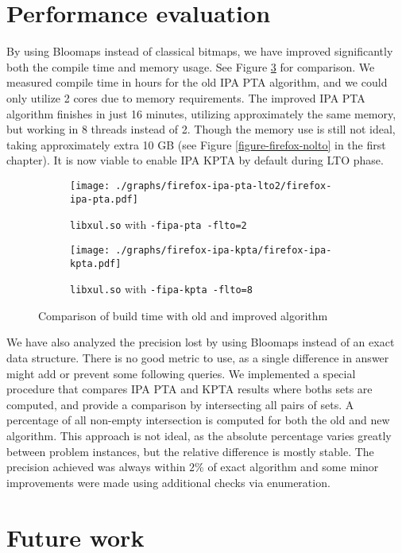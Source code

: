 \section{Performance evaluation}

By using Bloomaps instead of classical bitmaps, we have improved significantly
both the compile time and memory usage. See Figure
\ref{figure-new-old-comparison} for comparison. We measured compile time in
hours for the old IPA PTA algorithm, and we could only utilize 2 cores due to
memory requirements. The improved IPA PTA algorithm finishes in just 16 minutes,
utilizing approximately the same memory, but working in 8 threads instead of 2.
Though the memory use is still not ideal, taking approximately extra 10 GB (see
Figure \ref{figure-firefox-nolto} in the first chapter). It is now viable to
enable IPA KPTA by default during LTO phase.

\begin{figure}[!ht]
\begin{subfigure}[b]{\textwidth}
	\centering
	\texttt{[image: ./graphs/firefox-ipa-pta-lto2/firefox-ipa-pta.pdf]}
	\caption{{\tt libxul.so} with {\tt -fipa-pta -flto=2}}
	\label{figure-firefox-ipa-pta-lto2-2}
\end{subfigure}
\begin{subfigure}[b]{\textwidth}
	\centering
	\texttt{[image: ./graphs/firefox-ipa-kpta/firefox-ipa-kpta.pdf]}
	\caption{{\tt libxul.so} with {\tt -fipa-kpta -flto=8}}
	\label{figure-firefox-ipa-kpta}
\end{subfigure}
\caption{Comparison of build time with old and improved algorithm}
	\label{figure-new-old-comparison}
\end{figure}

We have also analyzed the precision lost by using Bloomaps instead of an exact
data structure. There is no good metric to use, as a single difference in
answer might add or prevent some following queries. We implemented a special
procedure that compares IPA PTA and KPTA results where boths sets are computed,
and provide a comparison by intersecting all pairs of sets. A percentage of all
non-empty intersection is computed for both the old and new algorithm. This
approach is not ideal, as the absolute percentage varies greatly between
problem instances, but the relative difference is mostly stable. The precision
achieved was always within $2\%$ of exact algorithm and some minor improvements
were made using additional checks via enumeration.

\section{Future work}

